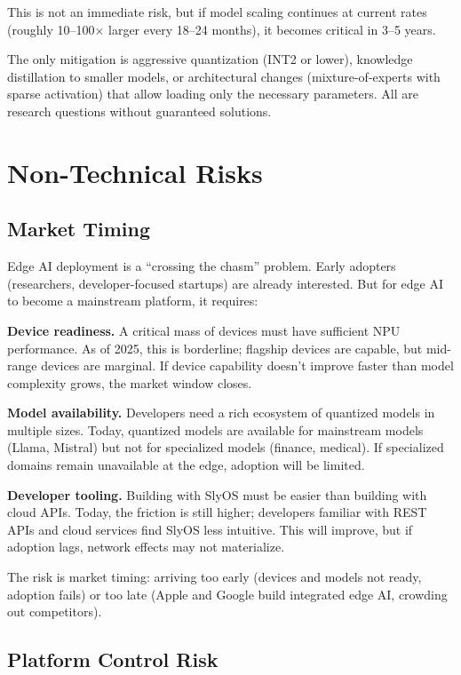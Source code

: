 \documentclass[12pt, letterpaper, twoside]{report}
\begin{document}
This is not an immediate risk, but if model scaling continues at current rates (roughly 10--100$\times$ larger every 18--24 months), it becomes critical in 3--5 years.

The only mitigation is aggressive quantization (INT2 or lower), knowledge distillation to smaller models, or architectural changes (mixture-of-experts with sparse activation) that allow loading only the necessary parameters. All are research questions without guaranteed solutions.

\section{Non-Technical Risks}
\label{sec:non_technical_risks}

\subsection{Market Timing}
\label{subsec:market_timing}

Edge AI deployment is a ``crossing the chasm'' problem. Early adopters (researchers, developer-focused startups) are already interested. But for edge AI to become a mainstream platform, it requires:

\textbf{Device readiness.} A critical mass of devices must have sufficient NPU performance. As of 2025, this is borderline; flagship devices are capable, but mid-range devices are marginal. If device capability doesn't improve faster than model complexity grows, the market window closes.

\textbf{Model availability.} Developers need a rich ecosystem of quantized models in multiple sizes. Today, quantized models are available for mainstream models (Llama, Mistral) but not for specialized models (finance, medical). If specialized domains remain unavailable at the edge, adoption will be limited.

\textbf{Developer tooling.} Building with SlyOS must be easier than building with cloud APIs. Today, the friction is still higher; developers familiar with REST APIs and cloud services find SlyOS less intuitive. This will improve, but if adoption lags, network effects may not materialize.

The risk is market timing: arriving too early (devices and models not ready, adoption fails) or too late (Apple and Google build integrated edge AI, crowding out competitors).

\subsection{Platform Control Risk}
\label{subsec:platform_control}
\end{document}

